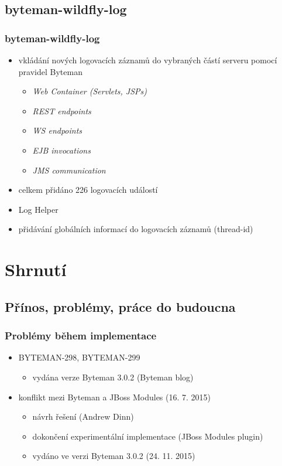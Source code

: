 \documentclass{beamer}
\begin{document}
\subsection{byteman-wildfly-log}
\begin{frame}[fragile] %
\frametitle{byteman-wildfly-log}
\begin{itemize}
	\item vkládání nových logovacích záznamů do vybraných částí serveru pomocí pravidel Byteman
	\begin{itemize}
		\item \textit{Web Container (Servlets, JSPs)}
		\item \textit{REST endpoints}
		\item \textit{WS endpoints}
		\item \textit{EJB invocations}
		\item \textit{JMS communication}
	\end{itemize}
	\item celkem přidáno 226 logovacích událostí
	\item Log Helper
	\item přidávání globálních informací do logovacích záznamů (thread-id)
\end{itemize}
\end{frame}


\section{Shrnutí}
\subsection{Přínos, problémy, práce do budoucna}
\begin{frame}
	\frametitle{Problémy během implementace}
	\begin{itemize}
		\item BYTEMAN-298, BYTEMAN-299
		\begin{itemize}
			\item vydána verze Byteman 3.0.2 (Byteman blog)
		\end{itemize}
		\item konflikt mezi Byteman a JBoss Modules (16. 7. 2015)
		\begin{itemize}
			\item návrh řešení (Andrew Dinn)
			\item dokončení experimentální implementace (JBoss Modules plugin)
			\item vydáno ve verzi Byteman 3.0.2 (24. 11. 2015)
		\end{itemize}
	\end{itemize}
\end{frame}
\end{document}
